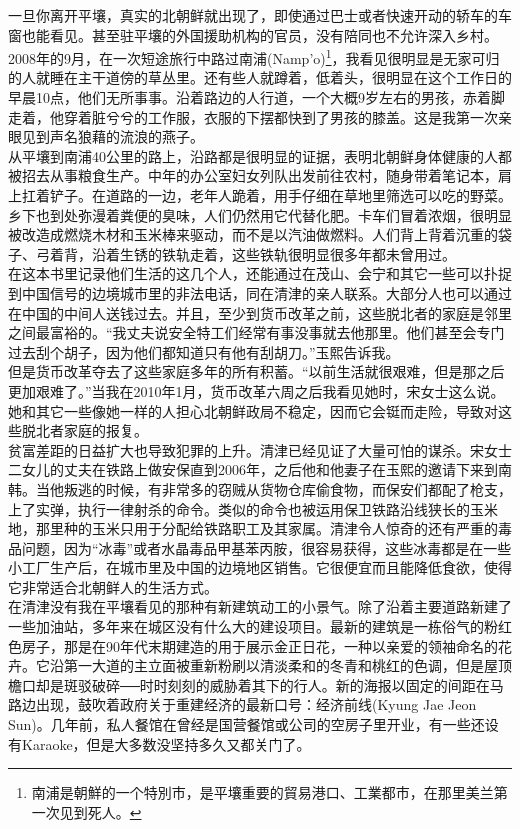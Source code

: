 一旦你离开平壤，真实的北朝鲜就出现了，即使通过巴士或者快速开动的轿车的车窗也能看见。甚至驻平壤的外国援助机构的官员，没有陪同也不允许深入乡村。2008年的9月，在一次短途旅行中路过南浦(Namp'o)\footnote{南浦是朝鮮的一个特別市，是平壤重要的貿易港口、工業都市，在那里美兰第一次见到死人。}，我看见很明显是无家可归的人就睡在主干道傍的草丛里。还有些人就蹲着，低着头，很明显在这个工作日的早晨10点，他们无所事事。沿着路边的人行道，一个大概9岁左右的男孩，赤着脚走着，他穿着脏兮兮的工作服，衣服的下摆都快到了男孩的膝盖。这是我第一次亲眼见到声名狼藉的流浪的燕子。\\

从平壤到南浦40公里的路上，沿路都是很明显的证据，表明北朝鲜身体健康的人都被招去从事粮食生产。中年的办公室妇女列队出发前往农村，随身带着笔记本，肩上扛着铲子。在道路的一边，老年人跪着，用手仔细在草地里筛选可以吃的野菜。乡下也到处弥漫着粪便的臭味，人们仍然用它代替化肥。卡车们冒着浓烟，很明显被改造成燃烧木材和玉米棒来驱动，而不是以汽油做燃料。人们背上背着沉重的袋子、弓着背，沿着生锈的铁轨走着，这些铁轨很明显很多年都未曾用过。\\

在这本书里记录他们生活的这几个人，还能通过在茂山、会宁和其它一些可以扑捉到中国信号的边境城市里的非法电话，同在清津的亲人联系。大部分人也可以通过在中国的中间人送钱过去。并且，至少到货币改革之前，这些脱北者的家庭是邻里之间最富裕的。“我丈夫说安全特工们经常有事没事就去他那里。他们甚至会专门过去刮个胡子，因为他们都知道只有他有刮胡刀。”玉熙告诉我。\\

但是货币改革夺去了这些家庭多年的所有积蓄。“以前生活就很艰难，但是那之后更加艰难了。”当我在2010年1月，货币改革六周之后我看见她时，宋女士这么说。她和其它一些像她一样的人担心北朝鲜政局不稳定，因而它会铤而走险，导致对这些脱北者家庭的报复。\\

贫富差距的日益扩大也导致犯罪的上升。清津已经见证了大量可怕的谋杀。宋女士二女儿的丈夫在铁路上做安保直到2006年，之后他和他妻子在玉熙的邀请下来到南韩。当他叛逃的时候，有非常多的窃贼从货物仓库偷食物，而保安们都配了枪支，上了实弹，执行一律射杀的命令。类似的命令也被运用保卫铁路沿线狭长的玉米地，那里种的玉米只用于分配给铁路职工及其家属。清津令人惊奇的还有严重的毒品问题，因为“冰毒”或者水晶毒品甲基苯丙胺，很容易获得，这些冰毒都是在一些小工厂生产后，在城市里及中国的边境地区销售。它很便宜而且能降低食欲，使得它非常适合北朝鲜人的生活方式。\\

在清津没有我在平壤看见的那种有新建筑动工的小景气。除了沿着主要道路新建了一些加油站，多年来在城区没有什么大的建设项目。最新的建筑是一栋俗气的粉红色房子，那是在90年代末期建造的用于展示金正日花，一种以亲爱的领袖命名的花卉。它沿第一大道的主立面被重新粉刷以清淡柔和的冬青和桃红的色调，但是屋顶檐口却是斑驳破碎──时时刻刻的威胁着其下的行人。新的海报以固定的间距在马路边出现，鼓吹着政府关于重建经济的最新口号：经济前线(Kyung Jae Jeon Sun)。几年前，私人餐馆在曾经是国营餐馆或公司的空房子里开业，有一些还设有Karaoke，但是大多数没坚持多久又都关门了。\\

